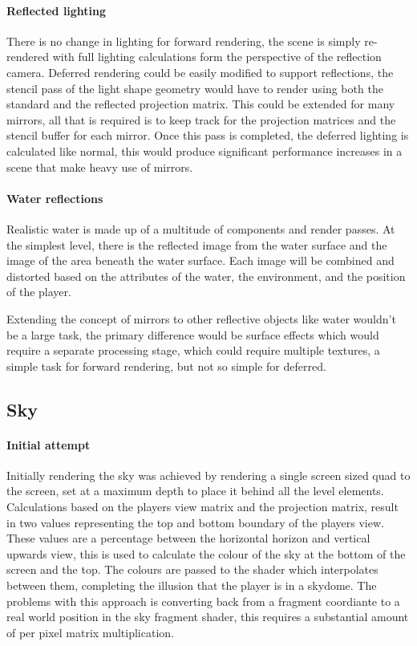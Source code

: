 \documentclass[conference]{acmsiggraph}
\begin{document}
\paragraph{Reflected lighting}
There is no change in lighting for forward rendering, the scene is simply re-rendered with full lighting calculations form the perspective of the reflection camera. Deferred rendering could be easily modified to support reflections, the stencil pass of the light shape geometry would have to render using both the standard and the reflected projection matrix. This could be extended for many mirrors, all that is required is to keep track for the projection matrices and the stencil buffer for each mirror. Once this pass is completed, the deferred lighting is calculated like normal, this would produce significant performance increases in a scene that make heavy use of mirrors.

\paragraph{Water reflections}
Realistic water is made up of a multitude of components and render passes. At the simplest level, there is the reflected image from the water surface and the image of the area beneath the water surface. Each image will be combined and distorted based on the attributes of the water, the environment, and the position of the player.

Extending the concept of mirrors to other reflective objects like water wouldn't be a large task, the primary difference would be surface effects which would require a separate processing stage, which could require multiple textures, a simple task for forward rendering, but not so simple for deferred.

\subsection{Sky}
\paragraph{Initial attempt}
Initially rendering the sky was achieved by rendering a single screen sized quad to the screen, set at a maximum depth to place it behind all the level elements. Calculations based on the players view matrix and the projection matrix, result in two values representing the top and bottom boundary of the players view. These values are a percentage between the horizontal horizon and vertical upwards view, this is used to calculate the colour of the sky at the bottom of the screen and the top. The colours are passed to the shader which interpolates between them, completing the illusion that the player is in a skydome.
The problems with this approach is converting back from a fragment coordiante to a real world position in the sky fragment shader, this requires a substantial amount of per pixel matrix multiplication.
\end{document}
